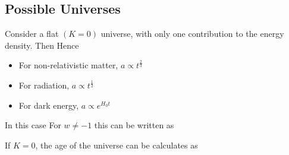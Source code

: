 \documentclass{article}
\begin{document}
\subsection{Possible Universes}

\begin{example}
Consider a flat $(K=0)$ universe, with only one contribution to the energy density. Then 
Hence \begin{itemize}
    \item For non-relativistic matter, $a \propto t^{\frac{2}{3}}$
    \item For radiation, $a \propto t^\frac{1}{2}$
    \item For dark energy, $a \propto e^{H_0 t}$
\end{itemize}

In this case 
For $w\neq -1$ this can be written as 
\end{example}

\begin{prop}
If $K=0$, the age of the universe can be calculates as 
\end{prop}
\end{document}
